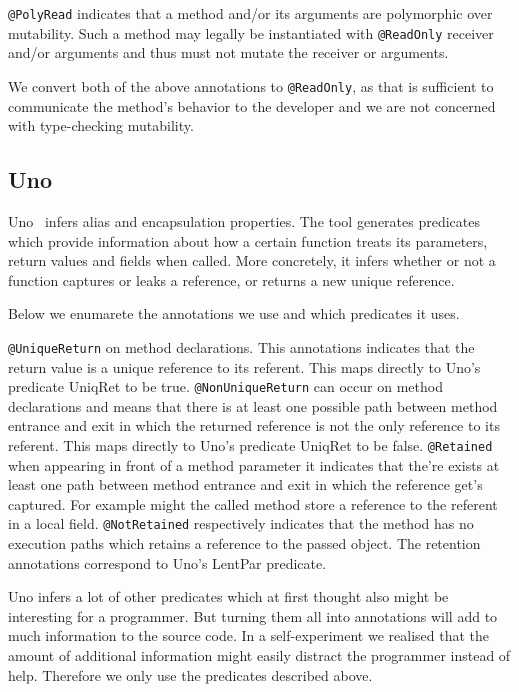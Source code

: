 \texttt{@PolyRead} indicates that a method and/or its arguments are polymorphic
over mutability. Such a method may legally be instantiated with
\texttt{@ReadOnly} receiver and/or arguments and thus must not mutate the
receiver or arguments.

We convert both of the above annotations to \texttt{@ReadOnly}, as
that is sufficient to communicate the method's behavior to the developer and we
are not concerned with type-checking mutability.

\subsection{Uno}

Uno~\cite{Uno} infers alias and encapsulation properties. The
tool generates predicates which provide information about how a certain
function treats its parameters, return values and fields when called. More
concretely, it infers whether or not a function captures or leaks a
reference, or returns a new unique reference.

Below we enumarete the annotations we use and which predicates it uses.

\texttt{@UniqueReturn} on method declarations. This annotations indicates 
that the return value is a unique reference to its referent. This maps directly
to Uno's predicate UniqRet to be true.
\texttt{@NonUniqueReturn} can occur on method declarations and means that 
there is at least one possible path between method entrance and exit in
which the returned reference is not the only reference to its referent.
This maps directly to Uno's predicate UniqRet to be false.
\texttt{@Retained} when appearing in front of a method parameter it indicates
that the're exists at least one path between method entrance and exit in 
which the reference get's captured. For example might the called method store
a reference to the referent in a local field.
\texttt{@NotRetained} respectively indicates that the method has no execution 
paths which retains a reference to the passed object.
The retention annotations correspond to Uno's LentPar predicate.

Uno infers a lot of other predicates which at first thought also might be 
interesting for a programmer. But turning them all into annotations will
add to much information to the source code. In a self-experiment we 
realised that the amount of additional information might easily distract
the programmer instead of help. Therefore we only use the predicates 
described above.

